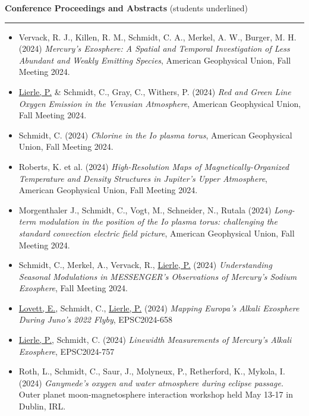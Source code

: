 \documentclass[12pt]{report}
\begin{document}
\vspace{2 mm}
\noindent\textbf{Conference Proceedings and Abstracts} (students underlined) \rm\hspace*{\fill} \\
\rule{\textwidth}{1pt}
 \begin{itemize} \itemsep -2pt %
   \item Vervack, R. J., Killen, R. M., Schmidt, C. A., Merkel, A. W., Burger, M. H. (2024) \textit{Mercury's Exosphere: A Spatial and Temporal Investigation of Less Abundant and Weakly Emitting Species}, American Geophysical Union, Fall Meeting 2024.
   \item \underline{Lierle, P.} \& Schmidt, C., Gray, C., Withers, P. (2024) \textit{Red and Green Line Oxygen Emission in the Venusian Atmosphere}, American Geophysical Union, Fall Meeting 2024.
   \item Schmidt, C. (2024) \textit{Chlorine in the Io plasma torus}, American Geophysical Union, Fall Meeting 2024.
   \item Roberts, K. et al. (2024) \textit{High-Resolution Maps of Magnetically-Organized Temperature and Density Structures in Jupiter’s Upper Atmosphere}, American Geophysical Union, Fall Meeting 2024.
   \item Morgenthaler J., Schmidt, C., Vogt, M., Schneider, N., Rutala (2024) \textit{Long-term modulation in the position of the Io plasma torus: challenging the standard convection electric field picture}, American Geophysical Union, Fall Meeting 2024.
   \item Schmidt, C., Merkel, A., Vervack, R., \underline{Lierle, P.} (2024) \textit{Understanding Seasonal Modulations in MESSENGER’s Observations of Mercury’s Sodium Exosphere}, Fall Meeting 2024.
   \item \underline{Lovett, E.}, Schmidt, C., \underline{Lierle, P.} (2024) \textit{Mapping Europa's Alkali Exosphere During Juno's 2022 Flyby}, EPSC2024-658
   \item \underline{Lierle, P.}, Schmidt, C. (2024) \textit{Linewidth Measurements of Mercury's Alkali Exosphere}, EPSC2024-757
   \item Roth, L., Schmidt, C., Saur, J., Molyneux, P., Retherford, K., Mykola, I. (2024) \textit{Ganymede's oxygen and water atmosphere during eclipse passage.} Outer planet moon-magnetosphere interaction workshop held May 13-17 in Dublin, IRL.

\end{itemize}
\end{document}

